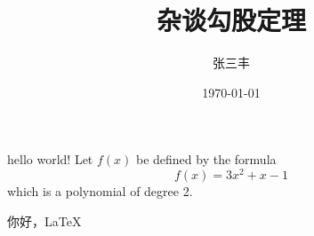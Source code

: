 \documentclass{article}%
\title{\heiti 杂谈勾股定理}
\author{\kaishu 张三丰}
\date{\today}
\begin{document}
	\maketitle %
	hello world!
	Let $f(x)$ be defined by the formula
	$$f(x)=3x^2+x-1$$which is a polynomial of degree 2.
	
	你好，\LaTeX
\end{document}
